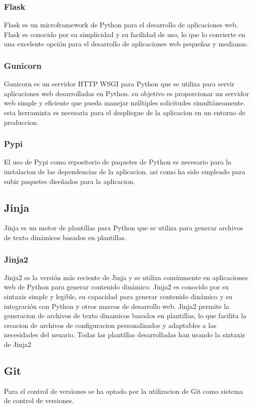 \documentclass[12pt, a4paper, twoside]{article}
\begin{document}
\subsubsection{Flask}
\cite{flask}
Flask es un microframework de Python para el desarrollo de aplicaciones web.
Flask es conocido por su simplicidad y su facilidad de uso, lo que lo convierte en una excelente opción para el desarrollo de aplicaciones web pequeñas y medianas.
\subsubsection{Gunicorn}
\cite{gunicorn}
Gunicorn es un servidor HTTP WSGI para Python que se utiliza para servir aplicaciones web desarrolladas en Python. su objetivo es proporcionar un servidor web simple y eficiente que pueda manejar múltiples solicitudes simultáneamente.
esta herraminta es necesaria para el despliegue de la aplicacion en un entorno de produccion.
\subsubsection{Pypi}
\cite{pypi}
El uso de Pypi como repositorio de paquetes de Python es necesario para la instalacion de las dependencias de la aplicacion.
asi como ha sido empleado para subir paquetes diseñados para la aplicacion.

\subsection{Jinja}
\cite{jinja}
Jinja es un motor de plantillas para Python que se utiliza para generar archivos de texto dinámicos basados en plantillas. 

\subsubsection{Jinja2}
Jinja2 es la versión más reciente de Jinja y se utiliza comúnmente en aplicaciones web de Python para generar contenido dinámico.
Jinja2 es conocido por su sintaxis simple y legible, su capacidad para generar contenido dinámico y su integración con Python y otros marcos de desarrollo web.
Jinja2 permite la generacion de archivos de texto dinamicos basados en plantillas, lo que facilita la creacion de archivos de configuracion personalizados y adaptables a las necesidades del usuario.
Todas las plantillas desarrolladas han usando la sintaxis de Jinja2



\subsection{Git}
\cite{git}
Para el control de versiones se ha optado por la utilizacion de Git como sistema de control de versiones.
\end{document}
